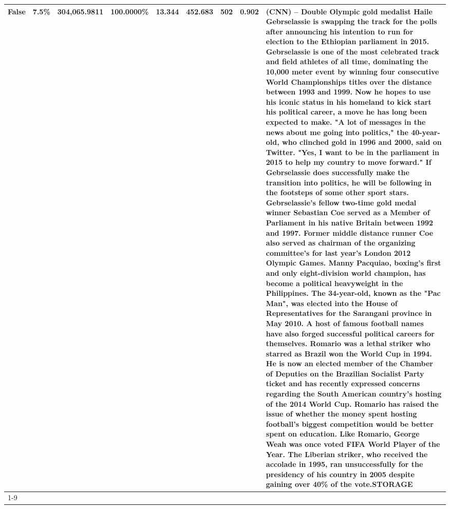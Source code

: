 \begin{table}[H]
{\begin{tabular}{lllrlllll}
False & 7.5\% & 304,065.9811 & \bfseries \color{red} 100.0000\% & 13.344 & 452.683 & 502 & 0.902 & (CNN) -- Double Olympic gold medalist Haile Gebrselassie is swapping the track for the polls after announcing his intention to run for election to the Ethiopian parliament in 2015. Gebrselassie is one of the most celebrated track and field athletes of all time, dominating the 10,000 meter event by winning four consecutive World Championships titles over the distance between 1993 and 1999. Now he hopes to use his iconic status in his homeland to kick start his political career, a move he has long been expected to make. "A lot of messages in the news about me going into politics," the 40-year-old, who clinched gold in 1996 and 2000, said on Twitter. "Yes, I want to be in the parliament in 2015 to help my country to move forward." If Gebrselassie does successfully make the transition into politics, he will be following in the footsteps of some other sport stars. Gebrselassie's fellow two-time gold medal winner Sebastian Coe served as a Member of Parliament in his native Britain between 1992 and 1997. Former middle distance runner Coe also served as chairman of the organizing committee's for last year's London 2012 Olympic Games. Manny Pacquiao, boxing's first and only eight-division world champion, has become a political heavyweight in the Philippines. The 34-year-old, known as the "Pac Man", was elected into the House of Representatives for the Sarangani province in May 2010. A host of famous football names have also forged successful political careers for themselves. Romario was a lethal striker who starred as Brazil won the World Cup in 1994. He is now an elected member of the Chamber of Deputies on the Brazilian Socialist Party ticket and has recently expressed concerns regarding the South American country's hosting of the 2014 World Cup. Romario has raised the issue of whether the money spent hosting football's biggest competition would be better spent on education. Like Romario, George Weah was once voted FIFA World Player of the Year. The Liberian striker, who received the accolade in 1995, ran unsuccessfully for the presidency of his country in 2005 despite gaining over 40\% of the vote.STORAGE \\
\cline{1-9}

\end{tabular}}
\end{table}
